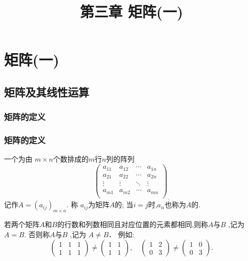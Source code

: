 
\makeatletter
\ifodd\value{page}
\else
\begin{frame}[plain]
\end{frame}
\fi
\makeatother


\renewcommand{\mydate}{2025年3月4号 \  第三次课}


\section{矩阵(一)}

\title{第三章 \quad 矩阵(一)}
\author{}
\date{}

\frame{\titlepage}


\subsection{矩阵及其线性运算}

\subsubsection{矩阵的定义}
\begin{frame}\frametitle{矩阵的定义}
\begin{definition}[矩阵] 一个为由 $m\times n$个数排成的$m$行$n$列的阵列
\[\left(
\begin{array}{cccc}
a_{11} & a_{12} & \cdots & a_{1 n}\\
a_{21} & a_{22} & \cdots & a_{2 n}\\
\vdots & \vdots & \ddots & \vdots\\
a_{m 1} & a_{m 2} & \cdots & a_{mn}\\
\end{array}
\right)_.\]
记作$A=(a_{ij})_{m\times n}$. \pp 称 $a_{ij}$为矩阵$A$的; \pp 当$i=j$时,$a_{ii}$也称为$A$的.
\end{definition}
\pp
若两个矩阵$A$和$B$的行数和列数相同且对应位置的元素都相同,则称$A$与$B$ ,记为$A=B$. \pp  否则称$A$与$B$ ,记为 $A\neq B$． \pp 例如:
\[
\begin{pmatrix}1&1&1\\1&1&1\end{pmatrix}\neq\begin{pmatrix}1&1\\1&1\end{pmatrix},\quad
\begin{pmatrix}1&2\\0&3\end{pmatrix}\neq\begin{pmatrix}1&0\\0&3\end{pmatrix}.
\]
\end{frame}





